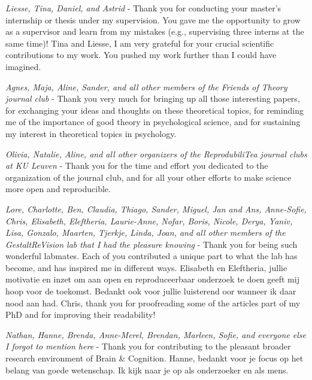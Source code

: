 \textit{Liesse, Tina, Daniel, and Astrid} - Thank you for conducting your master's internship or thesis under my supervision. You gave me the opportunity to grow as a supervisor and learn from my mistakes (e.g., supervising three interns at the same time)! Tina and Liesse, I am very grateful for your crucial scientific contributions to my work. You pushed my work further than I could have imagined.

\textit{Agnes, Maja, Aline, Sander, and all other members of the Friends of Theory journal club} - Thank you very much for bringing up all those interesting papers, for exchanging your ideas and thoughts on these theoretical topics, for reminding me of the importance of good theory in psychological science, and for sustaining my interest in theoretical topics in psychology.

\textit{Olivia, Natalie, Aline, and all other organizers of the ReprodubiliTea journal clubs at KU Leuven} - Thank you for the time and effort you dedicated to the organization of the journal club, and for all your other efforts to make science more open and reproducible.

\textit{Lore, Charlotte, Ben, Claudia, Thiago, Sander, Miguel, Jan and Ans, Anne-Sofie, Chris, Elisabeth, Eleftheria, Laurie-Anne, Nofar, Boris, Nicole, Derya, Yaniv, Lisa, Gonzalo, Maarten, Tjerkje, Linda, Joan, and all other members of the GestaltReVision lab that I had the pleasure knowing} - Thank you for being such wonderful labmates. Each of you contributed a unique part to what the lab has become, and has inspired me in different ways. Elisabeth en Eleftheria, jullie motivatie en inzet om aan open en reproduceerbaar onderzoek te doen geeft mij hoop voor de toekomst. Bedankt ook voor jullie luisterend oor wanneer ik daar nood aan had. Chris, thank you for proofreading some of the articles part of my PhD and for improving their readability!

\textit{Nathan, Hanne, Brenda, Anne-Merel, Brendan, Marleen, Sofie, and everyone else I forgot to mention here} - Thank you for contributing to the pleasant broader research environment of Brain \& Cognition. Hanne, bedankt voor je focus op het belang van goede wetenschap. Ik kijk naar je op als onderzoeker en als mens.

